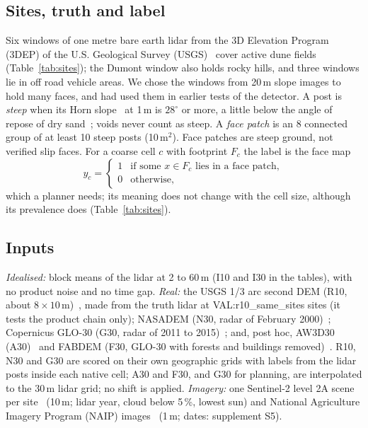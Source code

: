 \subsection{Sites, truth and label}
Six windows of one metre bare earth lidar from the 3D Elevation Program (3DEP) of the U.S. Geological Survey (USGS)~\cite{sugarbaker2014} cover active dune fields (Table~\ref{tab:sites}); the Dumont window also holds rocky hills, and three windows lie in off road vehicle areas. We chose the windows from 20\,m slope images to hold many faces, and had used them in earlier tests of the detector. A post is \emph{steep} when its Horn slope~\cite{horn1981} at 1\,m is $28^\circ$ or more, a little below the angle of repose of dry sand~\cite{pye2009}; voids never count as steep. A \emph{face patch} is an 8 connected group of at least 10 steep posts (10\,m$^2$). Face patches are steep ground, not verified slip faces. For a coarse cell $c$ with footprint $F_c$ the label is the face map
\begin{equation}
y_c = \begin{cases}1 & \text{if some } x \in F_c \text{ lies in a face patch},\\ 0 & \text{otherwise,}\end{cases}
\label{eq:label}
\end{equation}
which a planner needs; its meaning does not change with the cell size, although its prevalence does (Table~\ref{tab:sites}).

\subsection{Inputs}
\textit{Idealised:} block means of the lidar at 2 to 60\,m (I10 and I30 in the tables), with no product noise and no time gap. \textit{Real:} the USGS 1/3 arc second DEM (R10, about $8\times10$\,m)~\cite{usgs3dep13}, made from the truth lidar at {{VAL:r10_same_sites}} sites (it tests the product chain only); NASADEM (N30, radar of February 2000)~\cite{nasadem}; Copernicus GLO-30 (G30, radar of 2011 to 2015)~\cite{copernicusdem}; and, post hoc, AW3D30 (A30)~\cite{tadono2014aw3d} and FABDEM (F30, GLO-30 with forests and buildings removed)~\cite{hawker2022fabdem}. R10, N30 and G30 are scored on their own geographic grids with labels from the lidar posts inside each native cell; A30 and F30, and G30 for planning, are interpolated to the 30\,m lidar grid; no shift is applied. \textit{Imagery:} one Sentinel-2 level 2A scene per site~\cite{drusch2012sentinel} (10\,m; lidar year, cloud below 5\,\%, lowest sun) and National Agriculture Imagery Program (NAIP) images~\cite{naip} (1\,m; dates: supplement S5).


